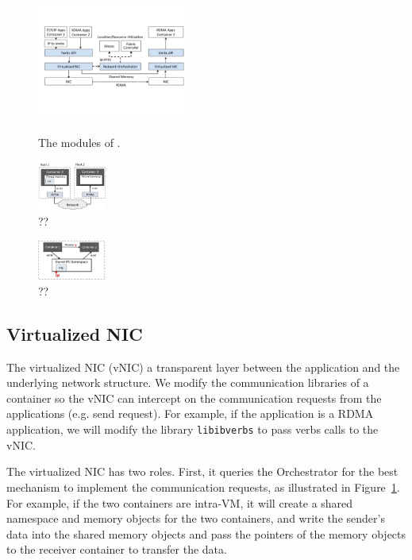      \begin{figure}[ht]
     \centering 
     \includegraphics[width=0.45\textwidth]{figures/system/system_modules.pdf}      
     \label{fig:system_modules}
     \caption{The modules of \sysname.} 
     \end{figure}
     
      \begin{figure}[ht]
         \centering 
         \includegraphics[width=0.2\textwidth]{figures/rdma-container.png}   
         \caption{??}   
      \end{figure}
      
      \begin{figure}[ht]
      	\centering 
      	\includegraphics[width=0.2\textwidth]{figures/shared-mem-container.png}   
      	\caption{??}   
      \end{figure}

\subsection{Virtualized NIC}
The virtualized NIC (vNIC) a transparent layer between the application and the underlying network structure.
We modify the communication libraries of a container so the vNIC can intercept on the communication requests
from the applications (e.g. send request). For example, if the application is a RDMA application, we
will modify the library \texttt{libibverbs} to pass verbs calls to the vNIC.

The virtualized NIC has two roles. First, it queries the Orchestrator for the best mechanism to implement the 
communication requests, as illustrated in Figure~\ref{fig:system_modules}.
For example, if the two containers are intra-VM, it will create a shared namespace and memory objects 
for the two containers, and write the sender's data into the shared memory objects and pass the pointers of the
memory objects to the receiver container to transfer the data.

